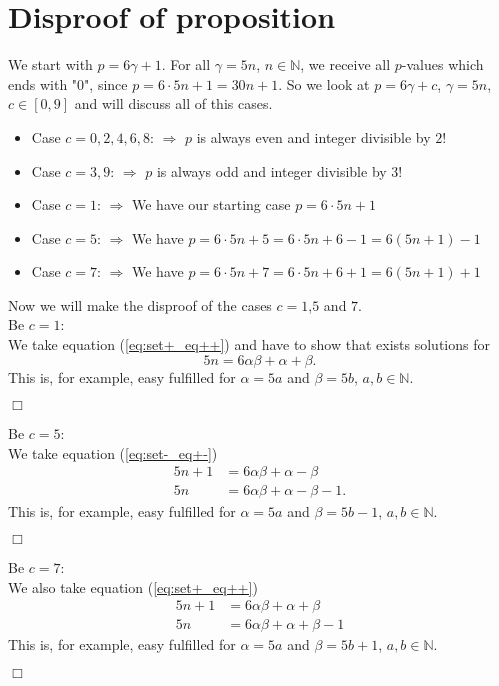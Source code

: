 \documentclass{amsart}
\begin{document}
\section{Disproof of proposition}
\label{s:disproof}
We start with $p = 6\gamma + 1$. For all $\gamma = 5n$, $n \in \mathbb{N}$, we receive all $p$-values which ends with "$0$", since $p = 6 \cdot 5 n + 1 = 30n + 1$. So we look at $p = 6\gamma + c$, $\gamma = 5n$, $c \in [0, 9]$ and will discuss all of this cases.
\begin{itemize}
	\item Case $c=0,2,4,6,8$: $\Rightarrow$ $p$ is always even and integer divisible by $2$!
	\item Case $c=3, 9$: $\Rightarrow$ $p$ is always odd and integer divisible by $3$!
	\item Case $c=1$: $\Rightarrow$ We have our starting case $p = 6\cdot5n + 1$	
	\item Case $c=5$: $\Rightarrow$ We have $p = 6\cdot5n + 5 = 6\cdot5n + 6 - 1 = 6\left(5n + 1\right) - 1$	
	\item Case $c=7$: $\Rightarrow$ We have $p = 6\cdot5n + 7 = 6\cdot5n + 6 + 1 = 6\left(5n + 1\right) + 1$
\end{itemize}
Now we will make the disproof of the cases $c=1$,$5$ and $7$.\\
Be $c=1$:\\
We take equation (\ref{eq:set+_eq++}) and have to show that exists solutions for
\[ 5n = 6\alpha\beta + \alpha + \beta. \]
This is, for example, easy fulfilled for $\alpha = 5a$ and $\beta = 5b$, $a,b \in \mathbb{N}$.
\begin{flushright}$\Box$\end{flushright}
Be $c=5$:\\
We take equation (\ref{eq:set-_eq+-})
\begin{equation*}\begin{split}
	5n + 1 & = 6\alpha\beta + \alpha - \beta\\
	5n & = 6\alpha\beta + \alpha - \beta - 1.
\end{split}\label{eq:c5}\end{equation*}
This is, for example, easy fulfilled for $\alpha = 5a$ and $\beta = 5b - 1$, $a,b \in \mathbb{N}$.
\begin{flushright}$\Box$\end{flushright}
Be $c=7$:\\
We also take equation (\ref{eq:set+_eq++})
\begin{equation*}\begin{split}
	5n + 1 & = 6\alpha\beta + \alpha + \beta\\
	5n & = 6\alpha\beta + \alpha + \beta - 1
\end{split}\label{eq:c7}\end{equation*}
This is, for example, easy fulfilled for $\alpha = 5a$ and $\beta = 5b + 1$, $a,b \in \mathbb{N}$.
\begin{flushright}$\Box$\end{flushright}


\end{document}
